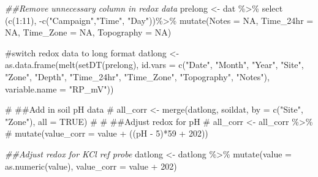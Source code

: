 \documentclass[
  letterpaper,
  DIV=11,
  numbers=noendperiod]{scrartcl}
\newenvironment{Shaded}{\begin{snugshade}}{\end{snugshade}}
\newcommand{\AttributeTok}[1]{\textcolor[rgb]{0.40,0.45,0.13}{#1}}
\newcommand{\CommentTok}[1]{\textcolor[rgb]{0.37,0.37,0.37}{#1}}
\newcommand{\ConstantTok}[1]{\textcolor[rgb]{0.56,0.35,0.01}{#1}}
\newcommand{\DecValTok}[1]{\textcolor[rgb]{0.68,0.00,0.00}{#1}}
\newcommand{\DocumentationTok}[1]{\textcolor[rgb]{0.37,0.37,0.37}{\textit{#1}}}
\newcommand{\FunctionTok}[1]{\textcolor[rgb]{0.28,0.35,0.67}{#1}}
\newcommand{\NormalTok}[1]{\textcolor[rgb]{0.00,0.23,0.31}{#1}}
\newcommand{\OtherTok}[1]{\textcolor[rgb]{0.00,0.23,0.31}{#1}}
\newcommand{\SpecialCharTok}[1]{\textcolor[rgb]{0.37,0.37,0.37}{#1}}
\newcommand{\StringTok}[1]{\textcolor[rgb]{0.13,0.47,0.30}{#1}}
\begin{document}
\begin{Shaded}
\begin{Highlighting}[]
\DocumentationTok{\#\#Remove unnecessary column in redox data}
\NormalTok{prelong }\OtherTok{\textless{}{-}}\NormalTok{ dat }\SpecialCharTok{\%\textgreater{}\%} 
  \FunctionTok{select}\NormalTok{ (}\FunctionTok{c}\NormalTok{(}\DecValTok{1}\SpecialCharTok{:}\DecValTok{11}\NormalTok{), }\SpecialCharTok{{-}}\FunctionTok{c}\NormalTok{(}\StringTok{"Campaign"}\NormalTok{,}\StringTok{"Time"}\NormalTok{, }\StringTok{"Day"}\NormalTok{))}\SpecialCharTok{\%\textgreater{}\%} 
  \FunctionTok{mutate}\NormalTok{(}\AttributeTok{Notes =} \ConstantTok{NA}\NormalTok{, }
         \AttributeTok{Time\_24hr =} \ConstantTok{NA}\NormalTok{, }
         \AttributeTok{Time\_Zone =} \ConstantTok{NA}\NormalTok{, }
         \AttributeTok{Topography =} \ConstantTok{NA}\NormalTok{)}

\CommentTok{\#switch redox data to long format }
\NormalTok{datlong }\OtherTok{\textless{}{-}}  \FunctionTok{as.data.frame}\NormalTok{(}\FunctionTok{melt}\NormalTok{(}\FunctionTok{setDT}\NormalTok{(prelong), }\AttributeTok{id.vars =} \FunctionTok{c}\NormalTok{(}\StringTok{"Date"}\NormalTok{, }\StringTok{"Month"}\NormalTok{, }\StringTok{"Year"}\NormalTok{, }\StringTok{"Site"}\NormalTok{, }\StringTok{"Zone"}\NormalTok{, }\StringTok{"Depth"}\NormalTok{, }\StringTok{"Time\_24hr"}\NormalTok{, }\StringTok{"Time\_Zone"}\NormalTok{, }\StringTok{"Topography"}\NormalTok{, }\StringTok{"Notes"}\NormalTok{), }
                               \AttributeTok{variable.name =} \StringTok{"RP\_mV"}\NormalTok{))}

\CommentTok{\# \#\#Add in soil pH data}
\CommentTok{\# all\_corr \textless{}{-} merge(datlong, soildat, by = c("Site", "Zone"), all = TRUE)}
\CommentTok{\# }
\CommentTok{\# \#\#Adjust redox for pH}
\CommentTok{\# all\_corr \textless{}{-} all\_corr \%\textgreater{}\% }
\CommentTok{\#   mutate(value\_corr = value + ((pH {-} 5)*59 + 202))}

\DocumentationTok{\#\#Adjust redox for KCl ref probe}
\NormalTok{datlong }\OtherTok{\textless{}{-}}\NormalTok{ datlong }\SpecialCharTok{\%\textgreater{}\%}
  \FunctionTok{mutate}\NormalTok{(}\AttributeTok{value =} \FunctionTok{as.numeric}\NormalTok{(value),}
         \AttributeTok{value\_corr =}\NormalTok{ value }\SpecialCharTok{+} \DecValTok{202}\NormalTok{)}


\end{Highlighting}
\end{Shaded}
\end{document}
